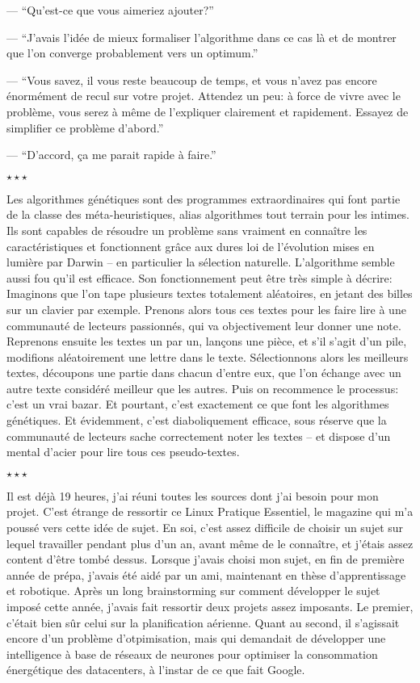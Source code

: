 \documentclass[letterpaper, 12pt]{report} %
\newcommand{\stardelimiter}{{\begin{center}\vspace{0.3cm} $\star \star \star$\vspace{0.3cm}\end{center}}}
\begin{document}
{--- ``Qu'est-ce que vous aimeriez ajouter?''

--- ``J'avais l'idée de mieux formaliser l'algorithme dans ce cas là et de montrer que l'on converge probablement vers un optimum.''

--- ``Vous savez, il vous reste beaucoup de temps, et vous n'avez pas encore énormément de recul sur votre projet.
		Attendez un peu: à force de vivre avec le problème, vous serez à même de l'expliquer clairement et rapidement.
		Essayez de simplifier ce problème d'abord.''

--- ``D'accord, ça me parait rapide à faire.''

\stardelimiter{}

Les algorithmes génétiques sont des programmes extraordinaires qui font partie de la classe des méta-heuristiques, alias algorithmes tout terrain pour les intimes. 
Ils sont capables de résoudre un problème sans vraiment en connaître les caractéristiques et fonctionnent grâce aux dures loi de l'évolution mises en lumière par Darwin -- en particulier la sélection naturelle. 
L'algorithme semble aussi fou qu'il est efficace.
Son fonctionnement peut être très simple à décrire: 
Imaginons que l'on tape plusieurs textes totalement aléatoires, en jetant des billes sur un clavier par exemple.
Prenons alors tous ces textes pour les faire lire à une communauté de lecteurs passionnés, qui va objectivement leur donner une note.
Reprenons ensuite les textes un par un, lançons une pièce, et s'il s'agit d'un pile, modifions aléatoirement une lettre dans le texte.
Sélectionnons alors les meilleurs textes, découpons une partie dans chacun d'entre eux, que l'on échange avec un autre texte considéré meilleur que les autres.
Puis on recommence le processus: c'est un vrai bazar. 
Et pourtant, c'est exactement ce que font les algorithmes génétiques.
Et évidemment, c'est diaboliquement efficace, sous réserve que la communauté de lecteurs sache correctement noter les textes -- et dispose d'un mental d'acier pour lire tous ces pseudo-textes.

\stardelimiter{}

Il est déjà 19 heures, j'ai réuni toutes les sources dont j'ai besoin pour mon projet. 
C'est étrange de ressortir ce Linux Pratique Essentiel, le magazine qui m'a poussé vers cette idée de sujet. 
En soi, c'est assez difficile de choisir un sujet sur lequel travailler pendant plus d'un an, avant même de le connaître,
et j'étais assez content d'être tombé dessus.
Lorsque j'avais choisi mon sujet, en fin de première année de prépa, j'avais été aidé par un ami, maintenant en thèse d'apprentissage et robotique.
Après un long brainstorming sur comment développer le sujet imposé cette année, j'avais fait ressortir deux projets assez imposants.
Le premier, c'était bien sûr celui sur la planification aérienne. 
Quant au second, il s'agissait encore d'un problème d'otpimisation, mais qui demandait de développer une intelligence à base de réseaux de neurones pour optimiser la consommation énergétique des datacenters, à l'instar de ce que fait Google.

}
\end{document}
